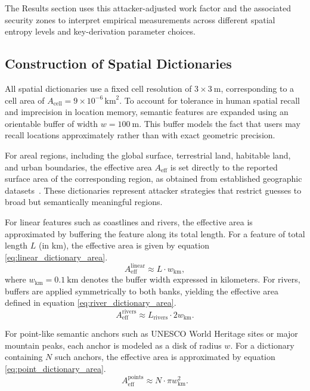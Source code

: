 \documentclass[journal,article,accept,pdftex,moreauthors]{Definitions/mdpi}
\begin{document}
The Results section uses this attacker-adjusted work factor and the associated security zones to interpret empirical measurements across different spatial entropy levels and key-derivation parameter choices.

\subsection{Construction of Spatial Dictionaries}

All spatial dictionaries use a fixed cell resolution of $3\times3~\text{m}$, corresponding to a cell area of $A_{\text{cell}} = 9 \times 10^{-6}\,\text{km}^2$. To account for tolerance in human spatial recall and imprecision in location memory, semantic features are expanded using an orientable buffer of width $w = 100~\text{m}$. This buffer models the fact that users may recall locations approximately rather than with exact geometric precision.

For areal regions, including the global surface, terrestrial land, habitable land, and urban boundaries, the effective area $A_{\text{eff}}$ is set directly to the reported surface area of the corresponding region, as obtained from established geographic datasets~\cite{FAO_GLC,Venter2016}. These dictionaries represent attacker strategies that restrict guesses to broad but semantically meaningful regions.

For linear features such as coastlines and rivers, the effective area is approximated by buffering the feature along its total length. For a feature of total length $L$ (in km), the effective area is given by equation \ref{eq:linear_dictionary_area}.
\begin{equation}
A_{\text{eff}}^{\text{linear}} \approx L \cdot w_{\text{km}},
\label{eq:linear_dictionary_area}
\end{equation}
where $w_{\text{km}} = 0.1~\text{km}$ denotes the buffer width expressed in kilometers. For rivers, buffers are applied symmetrically to both banks, yielding the effective area defined in equation \ref{eq:river_dictionary_area}.
\begin{equation}
A_{\text{eff}}^{\text{rivers}} \approx L_{\text{rivers}} \cdot 2 w_{\text{km}}.
\label{eq:river_dictionary_area}
\end{equation}

For point-like semantic anchors such as UNESCO World Heritage sites or major mountain peaks, each anchor is modeled as a disk of radius $w$. For a dictionary containing $N$ such anchors, the effective area is approximated by equation \ref{eq:point_dictionary_area}.
\begin{equation}
A_{\text{eff}}^{\text{points}} \approx N \cdot \pi w_{\text{km}}^2.
\label{eq:point_dictionary_area}
\end{equation}
\end{document}

